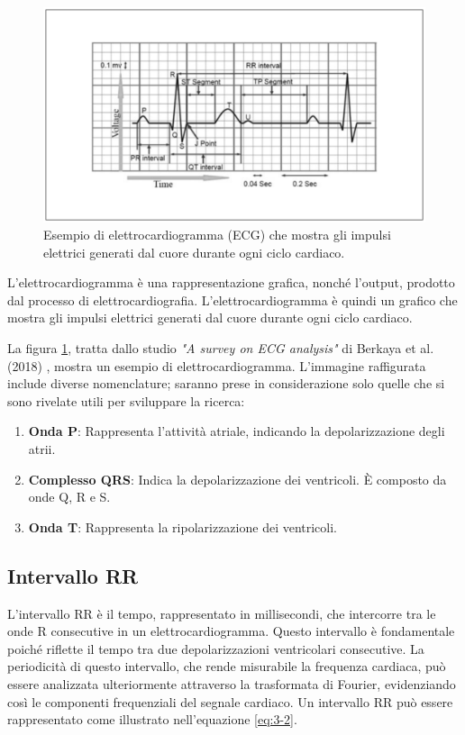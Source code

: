 \begin{figure}[t]
    \centering
    \includegraphics[width=\linewidth]{img//3/2.png}
    \caption{Esempio di elettrocardiogramma (ECG) che mostra gli impulsi elettrici generati dal cuore durante ogni ciclo cardiaco.}
    \label{fig:3-2}
\end{figure}

L'elettrocardiogramma è una rappresentazione grafica, nonché l'output, prodotto dal processo di elettrocardiografia. L'elettrocardiogramma è quindi un grafico che mostra gli impulsi elettrici generati dal cuore durante ogni ciclo cardiaco.

\bigskip

La figura \ref{fig:3-2}, tratta dallo studio \textit{"A survey on ECG analysis"} di Berkaya et al. (2018) \cite{berkaya2018survey}, mostra un esempio di elettrocardiogramma. L'immagine raffigurata include diverse nomenclature; saranno prese in considerazione solo quelle che si sono rivelate utili per sviluppare la ricerca:

\begin{enumerate}
    \item \textbf{Onda P}: Rappresenta l'attività atriale, indicando la depolarizzazione degli atrii.
    \item \textbf{Complesso QRS}: Indica la depolarizzazione dei ventricoli. È composto da onde Q, R e S.
    \item \textbf{Onda T}: Rappresenta la ripolarizzazione dei ventricoli.
\end{enumerate}

\subsection{Intervallo RR}

L'intervallo RR è il tempo, rappresentato in millisecondi, che intercorre tra le onde R consecutive in un elettrocardiogramma. Questo intervallo è fondamentale poiché riflette il tempo tra due depolarizzazioni ventricolari consecutive. La periodicità di questo intervallo, che rende misurabile la frequenza cardiaca, può essere analizzata ulteriormente attraverso la trasformata di Fourier, evidenziando così le componenti frequenziali del segnale cardiaco. Un intervallo RR può essere rappresentato come illustrato nell'equazione \ref{eq:3-2}.

